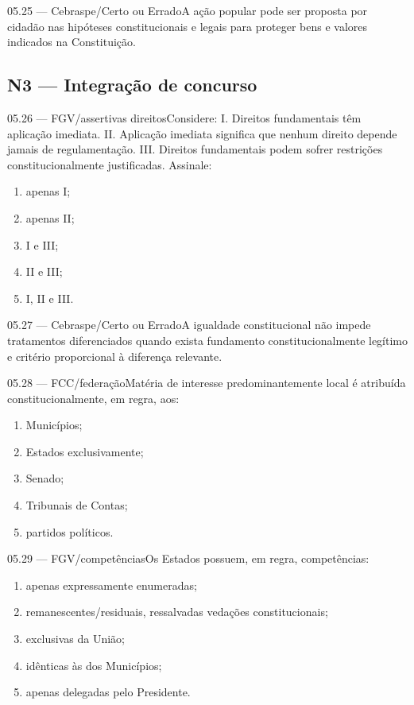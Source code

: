 \begin{questao}{ 05.25 — Cebraspe/Certo ou Errado}A ação popular pode ser proposta por cidadão nas hipóteses constitucionais e legais para proteger bens e valores indicados na Constituição.\end{questao}

\subsection*{N3 — Integração de concurso}
\begin{questao}{ 05.26 — FGV/assertivas direitos}Considere: I. Direitos fundamentais têm aplicação imediata. II. Aplicação imediata significa que nenhum direito depende jamais de regulamentação. III. Direitos fundamentais podem sofrer restrições constitucionalmente justificadas. Assinale:\begin{enumerate}[label=\Alph*)]\item apenas I;\item apenas II;\item I e III;\item II e III;\item I, II e III.\end{enumerate}\end{questao}
\begin{questao}{ 05.27 — Cebraspe/Certo ou Errado}A igualdade constitucional não impede tratamentos diferenciados quando exista fundamento constitucionalmente legítimo e critério proporcional à diferença relevante.\end{questao}
\begin{questao}{ 05.28 — FCC/federação}Matéria de interesse predominantemente local é atribuída constitucionalmente, em regra, aos:\begin{enumerate}[label=\Alph*)]\item Municípios;\item Estados exclusivamente;\item Senado;\item Tribunais de Contas;\item partidos políticos.\end{enumerate}\end{questao}
\begin{questao}{ 05.29 — FGV/competências}Os Estados possuem, em regra, competências:\begin{enumerate}[label=\Alph*)]\item apenas expressamente enumeradas;\item remanescentes/residuais, ressalvadas vedações constitucionais;\item exclusivas da União;\item idênticas às dos Municípios;\item apenas delegadas pelo Presidente.\end{enumerate}\end{questao}
